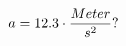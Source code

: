 \documentclass[preview]{standalone}
\begin{document}
\begin{align*}
\special{dvisvgm:raw <g id='unique000'>}a = 12.3 \cdot \frac{Meter}{s^{2}} ?\special{dvisvgm:raw </g>}
\end{align*}
\end{document}

